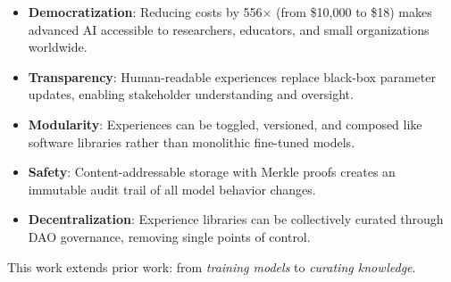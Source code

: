 \begin{itemize}
    \item \textbf{Democratization}: Reducing costs by 556× (from \$10,000 to \$18) makes advanced AI accessible to researchers, educators, and small organizations worldwide.

    \item \textbf{Transparency}: Human-readable experiences replace black-box parameter updates, enabling stakeholder understanding and oversight.

    \item \textbf{Modularity}: Experiences can be toggled, versioned, and composed like software libraries rather than monolithic fine-tuned models.

    \item \textbf{Safety}: Content-addressable storage with Merkle proofs creates an immutable audit trail of all model behavior changes.

    \item \textbf{Decentralization}: Experience libraries can be collectively curated through DAO governance, removing single points of control.
\end{itemize}

This work extends prior work: from \textit{training models} to \textit{curating knowledge}.

